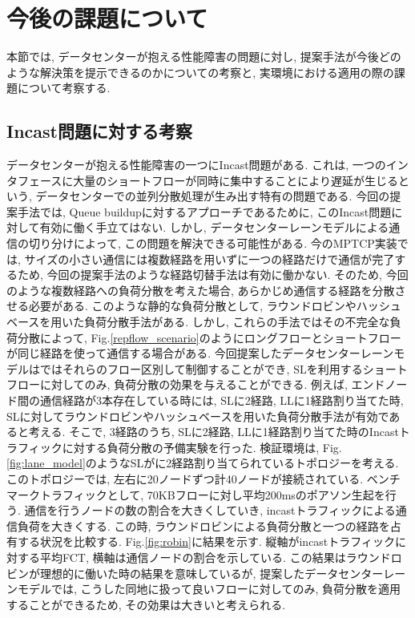 \section{今後の課題について}
本節では, データセンターが抱える性能障害の問題に対し, 提案手法が今後どのような解決策を提示できるのかについての考察と,
実環境における適用の際の課題について考察する. 

\subsection{Incast問題に対する考察}
データセンターが抱える性能障害の一つにIncast問題がある\cite{incast}. 
これは, 一つのインタフェースに大量のショートフローが同時に集中することにより遅延が生じるという, データセンターでの並列分散処理が生み出す特有の問題である. 
今回の提案手法では, Queue buildupに対するアプローチであるために, このIncast問題に対して有効に働く手立てはない. 
しかし, データセンターレーンモデルによる通信の切り分けによって, この問題を解決できる可能性がある. 
今のMPTCP実装では, サイズの小さい通信には複数経路を用いずに一つの経路だけで通信が完了するため, 今回の提案手法のような経路切替手法は有効に働かない.
そのため, 今回のような複数経路への負荷分散を考えた場合, あらかじめ通信する経路を分散させる必要がある. 
このような静的な負荷分散として, ラウンドロビンやハッシュベースを用いた負荷分散手法がある.
しかし, これらの手法ではその不完全な負荷分散によって,
Fig.\ref{repflow_scenario}のようにロングフローとショートフローが同じ経路を使って通信する場合がある. 
今回提案したデータセンターレーンモデルはではそれらのフロー区別して制御することができ, SLを利用するショートフローに対してのみ,
負荷分散の効果を与えることができる. 
例えば, エンドノード間の通信経路が3本存在している時には, SLに2経路, LLに1経路割り当てた時, 
SLに対してラウンドロビンやハッシュベースを用いた負荷分散手法が有効であると考える.
そこで, 3経路のうち, SLに2経路, LLに1経路割り当てた時のIncastトラフィックに対する負荷分散の予備実験を行った. 
検証環境は, Fig.\ref{fig:lane_model}のようなSLがに2経路割り当てられているトポロジーを考える. 
このトポロジーでは, 左右に20ノードずつ計40ノードが接続されている. 
ベンチマークトラフィックとして, 70KBフローに対し平均200msのポアソン生起を行う. 
通信を行うノードの数の割合を大きくしていき, incastトラフィックによる通信負荷を大きくする. 
この時, ラウンドロビンによる負荷分散と一つの経路を占有する状況を比較する. 
Fig.\ref{fig:robin}に結果を示す. 
縦軸がincastトラフィックに対する平均FCT, 横軸は通信ノードの割合を示している. 
この結果はラウンドロビンが理想的に働いた時の結果を意味しているが, 提案したデータセンターレーンモデルでは, こうした同地に扱って良いフローに対してのみ,
負荷分散を適用することができるため, その効果は大きいと考えられる. 

